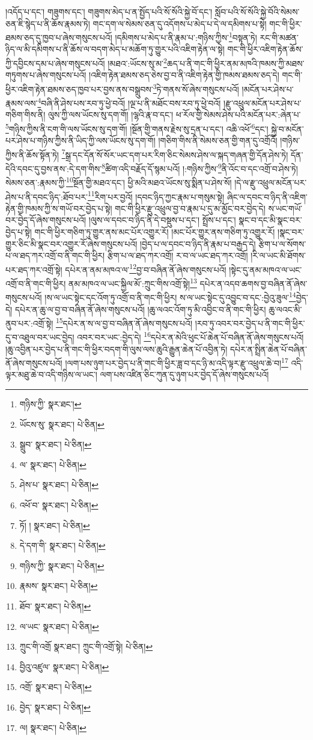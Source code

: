 །འདོད་པ་དང་། གཟུགས་དང་། གཟུགས་མེད་པ་ན་སྤྱོད་པའི་སོ་སོའི་སྐྱེ་བོ་དང་། སློབ་པའི་སོ་སོའི་སྐྱེ་བོའི་སེམས་ཅན་ཇི་སྙེད་པ་ནི་ཆོས་རྣམས་ཏེ། གང་དག་ལ་སེམས་ཅན་དུ་འདོགས་པ་མེད་པ་དེ་ལ་དམིགས་པ་སྟེ། གང་གི་ཕྱིར་ཐམས་ཅད་དུ་ཁྱབ་པ་ཞེས་གསུངས་པའོ། །དམིགས་པ་མེད་པ་ནི་རྣམ་པ་:གཉིས་ཀྱིས་\footnote{གཉིས་ཀྱི་  སྣར་ཐང་། }བསྟན་ཏེ། རང་གི་མཚན་ཉིད་ལ་མི་དམིགས་པ་ནི་ཆོས་ལ་བདག་མེད་པ་མཆོག་ཏུ་གྱུར་པའི་འཇིག་རྟེན་ལ་སྟེ། གང་གི་ཕྱིར་འཇིག་རྟེན་ཆོས་ཀྱི་དབྱིངས་དམ་པ་ཞེས་གསུངས་པའོ། །མཐའ་:ཡོངས་སུ་མ་\footnote{ཡོངས་སུ་  སྣར་ཐང་།  པེ་ཅིན། }ཆད་པ་ནི་གང་གི་ཕྱིར་ནམ་མཁའི་ཁམས་ཀྱི་མཐས་གཏུགས་པ་ཞེས་གསུངས་པའོ། །འཇིག་རྟེན་ཐམས་ཅད་ཅེས་བྱ་བ་ནི་འཇིག་རྟེན་གྱི་ཁམས་ཐམས་ཅད་དེ། གང་གི་ཕྱིར་འཇིག་རྟེན་ཐམས་ཅད་ཁྱབ་པར་བྱས་ནས་བསྒྲུབས་\footnote{སྒྲུབ་  སྣར་ཐང་།  པེ་ཅིན། }ཏེ་གནས་སོ་ཞེས་གསུངས་པའོ། །མངོན་པར་ཤེས་པ་རྣམས་ལས་\footnote{ལ་  སྣར་ཐང་།  པེ་ཅིན། }བཞི་ནི་ཤེས་པས་རབ་ཏུ་ཕྱེ་བའོ། །ལྔ་པ་ནི་མཐོང་བས་རབ་ཏུ་ཕྱེ་བའོ། །རྫུ་འཕྲུལ་མངོན་པར་ཤེས་པ་གཅིག་གིས་ནི། ལུས་ཀྱི་ལས་ཡོངས་སུ་དག་གོ། །ལྷའི་རྣ་བ་དང་། ཕ་རོལ་གྱི་སེམས་ཤེས་པའི་མངོན་པར་:ཞེན་པ་\footnote{ཤེས་པ་  སྣར་ཐང་།  པེ་ཅིན། }གཉིས་ཀྱིས་ནི་ངག་གི་ལས་ཡོངས་སུ་དག་གོ། །སྔོན་གྱི་གནས་རྗེས་སུ་དྲན་པ་དང་། འཆི་འཕོ་\footnote{འཕོ་བ་  སྣར་ཐང་།  པེ་ཅིན། }དང་། སྐྱེ་བ་མངོན་པར་ཤེས་པ་གཉིས་ཀྱིས་ནི་ཡིད་ཀྱི་ལས་ཡོངས་སུ་དག་གོ། །གཅིག་གིས་ནི་སེམས་ཅན་གྱི་གན་དུ་འགྲོའོ། །གཉིས་ཀྱིས་ནི་ཆོས་སྟོན་ཏེ། \footnote{ཏོ། །   སྣར་ཐང་།  པེ་ཅིན། }སྒྲ་དང་དོན་སོ་སོར་ཡང་དག་པར་རིག་ཅིང་སེམས་ཤེས་ལ་སྐད་གཞན་གྱི་དོན་ཤེས་ཏེ། དོན་དེའི་དབང་དུ་བྱས་ནས་:དེ་དག་གིས་\footnote{དེ་དག་གི་  སྣར་ཐང་།  པེ་ཅིན། }ཚིག་འདི་བརྗོད་དོ་སྙམ་པའོ། །:གཉིས་ཀྱིས་\footnote{གཉིས་ཀྱི་  སྣར་ཐང་།  པེ་ཅིན། }ནི་འོང་བ་དང་འགྲོ་བ་ཤེས་ཏེ། སེམས་ཅན་:རྣམས་ཀྱི་\footnote{རྣམས་  སྣར་ཐང་།  པེ་ཅིན། }སྔོན་གྱི་མཐའ་དང་། ཕྱི་མའི་མཐའ་ཡོངས་སུ་སྨིན་པ་ཤེས་སོ། །དེ་ལ་རྫུ་འཕྲུལ་མངོན་པར་ཤེས་པ་ནི་དབང་ཉིད་:ཐོབ་པར་\footnote{ཐོབ་  སྣར་ཐང་།  པེ་ཅིན། }རིག་པར་བྱའོ། །དབང་ཉིད་ཀྱང་རྣམ་པ་གསུམ་སྟེ། ཞིང་ལ་དབང་བ་ཉིད་ནི་འཇིག་རྟེན་གྱི་ཁམས་ཀྱི་ས་གཡོ་བར་བྱེད་པ་སྟེ། གང་གི་ཕྱིར་རྫུ་འཕྲུལ་བྱ་བ་རྣམ་པ་དུ་མ་མྱོང་བར་བྱེད་དེ། ས་ཡང་གཡོ་བར་བྱེད་དོ་ཞེས་གསུངས་པའོ། །ལུས་ལ་དབང་བ་ཉིད་ནི་དེ་བསྡུས་པ་དང་། སྤྲོས་པ་དང་། སྣང་བ་དང་མི་སྣང་བར་བྱེད་པ་སྟེ། གང་གི་ཕྱིར་གཅིག་ཏུ་གྱུར་ནས་མང་པོར་འགྱུར་རོ། །མང་པོར་གྱུར་ནས་གཅིག་ཏུ་འགྱུར་རོ། །སྣང་བར་གྱུར་ཅིང་མི་སྣང་བར་འགྱུར་རོ་ཞེས་གསུངས་པའོ། །བྱེད་པ་ལ་དབང་བ་ཉིད་ནི་རྣམ་པ་བརྒྱད་དེ། རྩིག་པ་ལ་སོགས་པ་ལ་ཐད་ཀར་འགྲོ་བ་ནི་གང་གི་ཕྱིར། རྩིག་པ་ལ་ཐད་ཀར་འགྲོ། ར་བ་ལ་ཡང་ཐད་ཀར་འགྲོ། །རི་ལ་ཡང་མི་ཐོགས་པར་ཐད་ཀར་འགྲོ་སྟེ། དཔེར་ན་ནམ་མཁའ་ལ་\footnote{ལ་ཡང་  སྣར་ཐང་།  པེ་ཅིན། }བྱ་བ་བཞིན་ནོ་ཞེས་གསུངས་པའོ། །སྟེང་དུ་ནམ་མཁའ་ལ་ཡང་འགྲོ་བ་ནི་གང་གི་ཕྱིར། ནམ་མཁའ་ལ་ཡང་སྐྱིལ་མོ་:ཀྲུང་གིས་འགྲོ་སྟེ།\footnote{ཀྲུང་གི་འགྲོ  སྣར་ཐང་། ཀྲུང་གི་འགྲོ་སྟེ།  པེ་ཅིན། } དཔེར་ན་འདབ་ཆགས་བྱ་བཞིན་ནོ་ཞེས་གསུངས་པའོ། །ས་ལ་ཡང་སྟེང་དང་འོག་ཏུ་འགྲོ་བ་ནི་གང་གི་ཕྱིར། ས་ལ་ཡང་སྟེང་དུ་འབྱུང་བ་དང་:བྱེའུ་ཟུལ་\footnote{བྱིའུ་འཛུལ་  སྣར་ཐང་།  པེ་ཅིན། }བྱེད་དེ། དཔེར་ན་ཆུ་ལ་བྱ་བ་བཞིན་ནོ་ཞེས་གསུངས་པའོ། །ཆུ་ལའང་འོག་ཏུ་མི་འབྱིང་བ་ནི་གང་གི་ཕྱིར། ཆུ་ལའང་མི་ནུབ་པར་:འགྲོ་སྟེ། \footnote{འགྲོ་  སྣར་ཐང་།  པེ་ཅིན། }དཔེར་ན་ས་ལ་བྱ་བ་བཞིན་ནོ་ཞེས་གསུངས་པའོ། །རབ་ཏུ་འབར་བར་བྱེད་པ་ནི་གང་གི་ཕྱིར་དུ་བ་འཐུལ་བར་ཡང་བྱེད། འབར་བར་ཡང་:བྱེད་དེ། \footnote{བྱེད་  སྣར་ཐང་།  པེ་ཅིན། }དཔེར་ན་མེའི་ཕུང་པོ་ཆེན་པོ་བཞིན་ནོ་ཞེས་གསུངས་པའོ། །ཆུ་འབྱིན་པར་བྱེད་པ་ནི་གང་གི་ཕྱིར་བདག་གི་ལུས་ལས་ཆུའི་རྒྱུན་ཆེན་པོ་འབྱིན་ཏེ། དཔེར་ན་སྤྲིན་ཆེན་པོ་བཞིན་ནོ་ཞེས་གསུངས་པའོ། །ལག་པས་ཉུག་པར་བྱེད་པ་ནི་གང་གི་ཕྱིར་ཟླ་བ་དང་ཉི་མ་འདི་ལྟར་རྫུ་འཕྲུལ་ཆེ་བ།\footnote{ལ།  སྣར་ཐང་།  པེ་ཅིན། } འདི་ལྟར་མཐུ་ཆེ་བ་འདི་གཉིས་ལ་ཡང་། ལག་པས་འཛིན་ཅིང་ཀུན་དུ་ཉུག་པར་བྱེད་དོ་ཞེས་གསུངས་པའོ། 
